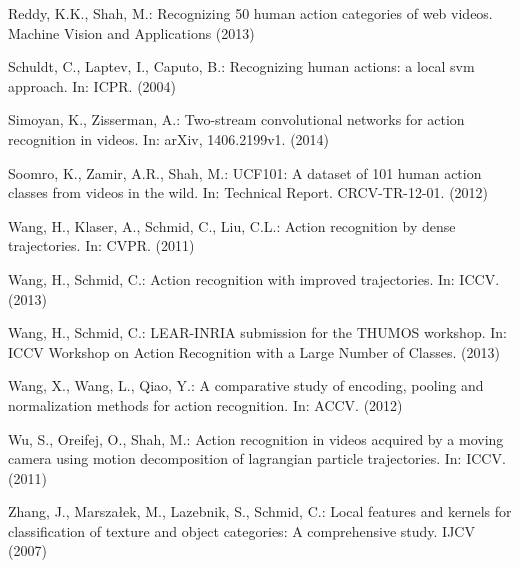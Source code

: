 \documentclass[runningheads]{llncs}
\begin{document}
\begin{thebibliography}{10}
Reddy, K.K., Shah, M.:
\newblock Recognizing 50 human action categories of web videos.
\newblock Machine Vision and Applications (2013)

Schuldt, C., Laptev, I., Caputo, B.:
\newblock Recognizing human actions: a local svm approach.
\newblock In: ICPR. (2004)

Simoyan, K., Zisserman, A.:
\newblock Two-stream convolutional networks for action recognition in videos.
\newblock In: arXiv, 1406.2199v1.
\newblock (2014)

Soomro, K., Zamir, A.R., Shah, M.:
\newblock UCF101: A dataset of 101 human action classes
from videos in the wild.
\newblock In: Technical Report. CRCV-TR-12-01.
\newblock (2012)

Wang, H., Klaser, A., Schmid, C., Liu, C.L.:
\newblock Action recognition by dense trajectories.
\newblock In: CVPR. (2011)

Wang, H., Schmid, C.:
\newblock Action recognition with improved trajectories.
\newblock In: ICCV. (2013)

Wang, H., Schmid, C.:
\newblock LEAR-INRIA submission for the THUMOS workshop.
\newblock In: ICCV Workshop on Action Recognition with a Large Number of Classes.
\newblock (2013)

Wang, X., Wang, L., Qiao, Y.:
\newblock A comparative study of encoding, pooling and normalization methods
  for action recognition.
\newblock In: ACCV.
\newblock (2012)

Wu, S., Oreifej, O., Shah, M.:
\newblock Action recognition in videos acquired by a moving camera using motion
  decomposition of lagrangian particle trajectories.
\newblock In: ICCV. (2011)

Zhang, J., Marsza{\l}ek, M., Lazebnik, S., Schmid, C.:
\newblock Local features and kernels for classification of texture and object
  categories: A comprehensive study.
\newblock IJCV (2007)

\end{thebibliography}


\end{document}
